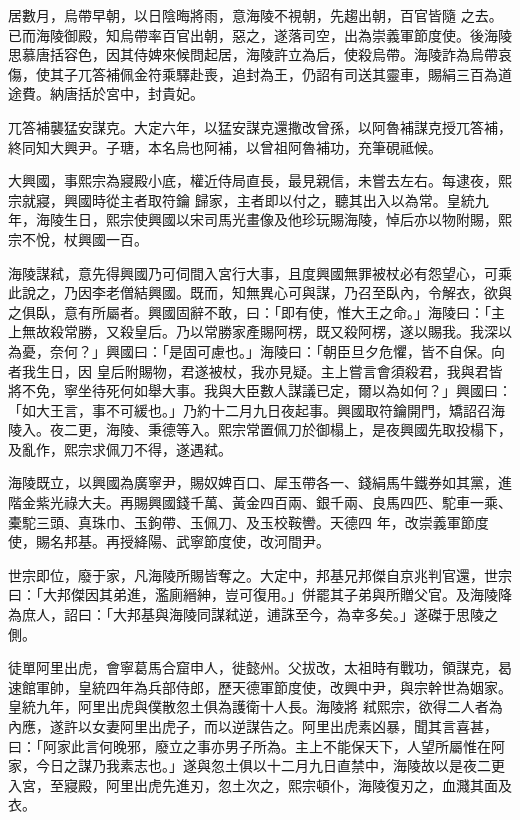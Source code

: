 \begin{pinyinscope}
 居數月，烏帶早朝，以日陰晦將雨，意海陵不視朝，先趨出朝，百官皆隨
 之去。已而海陵御殿，知烏帶率百官出朝，惡之，遂落司空，出為崇義軍節度使。後海陵思慕唐括容色，因其侍婢來候問起居，海陵許立為后，使殺烏帶。海陵詐為烏帶哀傷，使其子兀答補佩金符乘驛赴喪，追封為王，仍詔有司送其靈車，賜絹三百為道途費。納唐括於宮中，封貴妃。



 兀答補襲猛安謀克。大定六年，以猛安謀克還撒改曾孫，以阿魯補謀克授兀答補，終同知大興尹。子瑭，本名烏也阿補，以曾祖阿魯補功，充筆硯祗候。



 大興國，事熙宗為寢殿小底，權近侍局直長，最見親信，未嘗去左右。每逮夜，熙宗就寢，興國時從主者取符鑰
 歸家，主者即以付之，聽其出入以為常。皇統九年，海陵生日，熙宗使興國以宋司馬光畫像及他珍玩賜海陵，悼后亦以物附賜，熙宗不悅，杖興國一百。



 海陵謀弒，意先得興國乃可伺間入宮行大事，且度興國無罪被杖必有怨望心，可乘此說之，乃因李老僧結興國。既而，知無異心可與謀，乃召至臥內，令解衣，欲與之俱臥，意有所屬者。興國固辭不敢，曰：「即有使，惟大王之命。」海陵曰：「主上無故殺常勝，又殺皇后。乃以常勝家產賜阿楞，既又殺阿楞，遂以賜我。我深以為憂，奈何？」興國曰：「是固可慮也。」海陵曰：「朝臣旦夕危懼，皆不自保。向者我生日，因
 皇后附賜物，君遂被杖，我亦見疑。主上嘗言會須殺君，我與君皆將不免，寧坐待死何如舉大事。我與大臣數人謀議已定，爾以為如何？」興國曰：「如大王言，事不可緩也。」乃約十二月九日夜起事。興國取符鑰開門，矯詔召海陵入。夜二更，海陵、秉德等入。熙宗常置佩刀於御榻上，是夜興國先取投榻下，及亂作，熙宗求佩刀不得，遂遇弒。



 海陵既立，以興國為廣寧尹，賜奴婢百口、犀玉帶各一、錢絹馬牛鐵券如其黨，進階金紫光祿大夫。再賜興國錢千萬、黃金四百兩、銀千兩、良馬四匹、駝車一乘、橐駝三頭、真珠巾、玉鉤帶、玉佩刀、及玉校鞍轡。天德四
 年，改崇義軍節度使，賜名邦基。再授絳陽、武寧節度使，改河間尹。



 世宗即位，廢于家，凡海陵所賜皆奪之。大定中，邦基兄邦傑自京兆判官還，世宗曰：「大邦傑因其弟進，濫廁縉紳，豈可復用。」併罷其子弟與所贈父官。及海陵降為庶人，詔曰：「大邦基與海陵同謀弒逆，逋誅至今，為幸多矣。」遂磔于思陵之側。



 徒單阿里出虎，會寧葛馬合窟申人，徙懿州。父拔改，太祖時有戰功，領謀克，曷速館軍帥，皇統四年為兵部侍郎，歷天德軍節度使，改興中尹，與宗幹世為姻家。皇統九年，阿里出虎與僕散忽土俱為護衛十人長。海陵將
 弒熙宗，欲得二人者為內應，遂許以女妻阿里出虎子，而以逆謀告之。阿里出虎素凶暴，聞其言喜甚，曰：「阿家此言何晚邪，廢立之事亦男子所為。主上不能保天下，人望所屬惟在阿家，今日之謀乃我素志也。」遂與忽土俱以十二月九日直禁中，海陵故以是夜二更入宮，至寢殿，阿里出虎先進刃，忽土次之，熙宗頓仆，海陵復刃之，血濺其面及衣。




\end{pinyinscope}
